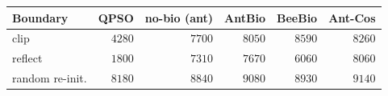 \begin{tabular}{lrrrrr}
\toprule
Boundary & QPSO & no-bio (ant) & AntBio & BeeBio & Ant-Cos \\
\midrule
clip & $4280$ & $7700$ & $8050$ & $8590$ & $8260$ \\
reflect & $1800$ & $7310$ & $7670$ & $6060$ & $8060$ \\
random re-init. & $8180$ & $8840$ & $9080$ & $8930$ & $9140$ \\
\bottomrule
\end{tabular}
